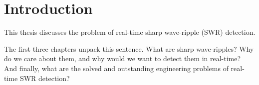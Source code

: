 
\chapter{Introduction}


This thesis discusses the problem of real-time sharp wave-ripple (SWR)
detection.

The first three chapters unpack this sentence. What are sharp wave-ripples?
Why do we care about them, and why would we want to detect them in real-time?
And finally, what are the solved and outstanding engineering problems of
real-time SWR detection?















